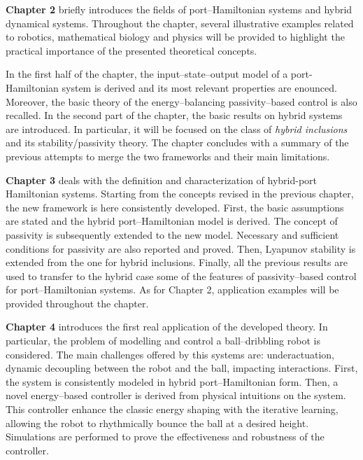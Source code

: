%
\textbf{Chapter 2} briefly introduces the fields of port--Hamiltonian systems and hybrid dynamical systems. Throughout the chapter, several illustrative examples related to robotics, mathematical biology and physics will be provided to highlight the practical importance of the presented theoretical concepts. 

In the first half of the chapter, the input--state--output model of a port-Hamiltonian system is derived and its most relevant properties are enounced. Moreover, the basic theory of the energy--balancing passivity--based control is also recalled. In the second part of the chapter, the basic results on hybrid systems are introduced. In particular, it will be focused on the class of \textit{hybrid inclusions} and its stability/passivity theory.  The chapter concludes with a summary of the previous attempts to merge the two frameworks and their main limitations. 
%
\newline

%
\textbf{Chapter 3} deals with the definition and characterization of hybrid-port Hamiltonian systems. Starting from the concepts revised in the previous chapter, the new framework is here consistently developed. First, the basic assumptions are stated and the hybrid port--Hamiltonian model is derived. The concept of passivity is subsequently extended to the new model. Necessary and sufficient conditions for passivity are also reported and proved. Then, Lyapunov stability is extended from the one for hybrid inclusions. Finally, all the previous results are used to transfer to the hybrid case some of the features of passivity--based control for port--Hamiltonian systems. As for Chapter 2, application examples will be provided throughout the chapter.
%
\newline

%
\textbf{Chapter 4} introduces the first real application of the developed theory. In particular, the problem of modelling and control a ball--dribbling robot is considered. The main challenges offered by this systems are: underactuation, dynamic decoupling between the robot and the ball, impacting interactions. First, the system is consistently modeled in hybrid port--Hamiltonian form. Then, a novel energy--based controller is derived from physical intuitions on the system. This controller enhance the classic energy shaping with the iterative learning, allowing the robot to rhythmically bounce the ball at a desired height. Simulations are performed to prove the effectiveness and robustness of the controller.   
%
\newline

